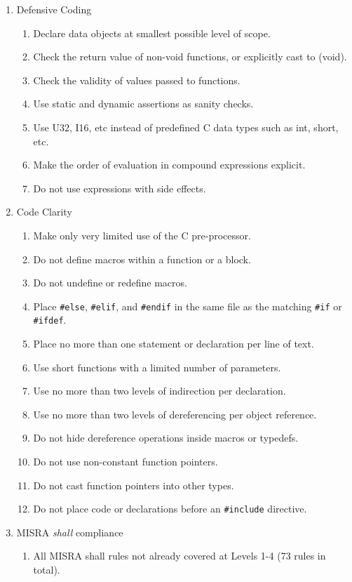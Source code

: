 \begin{example}
\begin{enumerate}
 \item Defensive Coding 
 \begin{enumerate}
  \item Declare data objects at smallest possible level of scope. 
  \item Check the return value of non-void functions, or explicitly cast to (void). 
  \item Check the validity of values passed to functions. 
  \item Use static and dynamic assertions as sanity checks. 
  \item Use U32, I16, etc instead of predefined C data types such as int, short, etc. 
  \item Make the order of evaluation in compound expressions explicit. 
  \item Do not use expressions with side effects. 
 \end{enumerate}

 \item Code Clarity 
 \begin{enumerate}
  \item Make only very limited use of the C pre-processor. 
  \item Do not define macros within a function or a block. 
  \item Do not undefine or redefine macros. 
  \item Place \texttt{\#else}, \texttt{\#elif}, and \texttt{\#endif} in the same file as the matching \texttt{\#if} or \texttt{\#ifdef}. 
  \item Place no more than one statement or declaration per line of text. 
  \item Use short functions with a limited number of parameters. 
  \item Use no more than two levels of indirection per declaration. 
  \item Use no more than two levels of dereferencing per object reference. 
  \item Do not hide dereference operations inside macros or typedefs. 
  \item Do not use non-constant function pointers. 
  \item Do not cast function pointers into other types. 
  \item Do not place code or declarations before an \texttt{\#include} directive. 
 \end{enumerate}

 \item MISRA \emph{shall} compliance 
 \begin{enumerate}
   \item All MISRA shall rules not already covered at Levels 1-4 (73 rules in total).
 \end{enumerate}


\end{enumerate}
\end{example}
